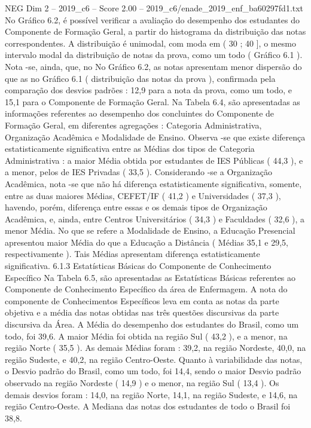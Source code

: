 \begin{textsample}{NEG Dim 2 – 2019\_c6 – Score 2.00 – 2019\_c6/enade\_2019\_enf\_ba60297fd1.txt}
No Gráfico 6.2, é possível verificar a avaliação do desempenho dos estudantes do Componente de Formação Geral, a partir do histograma da distribuição das notas correspondentes.
A distribuição é unimodal, com moda em ( 30 ; 40 ], o mesmo intervalo modal da distribuição de notas da prova, como um todo ( Gráfico 6.1 ).
Nota -se, ainda, que, no No Gráfico 6.2, as notas apresentam menor dispersão do que as no Gráfico 6.1 ( distribuição das notas da prova ), confirmada pela comparação dos desvios padrões : 12,9 para a nota da prova, como um todo, e 15,1 para o Componente de Formação Geral.
Na Tabela 6.4, são apresentadas as informações referentes ao desempenho dos concluintes do Componente de Formação Geral, em diferentes agregações : Categoria Administrativa, Organização Acadêmica e Modalidade de Ensino.
Observa -se que existe diferença estatisticamente significativa entre as Médias dos tipos de Categoria Administrativa : a maior Média obtida por estudantes de IES Públicas ( 44,3 ), e a menor, pelos de IES Privadas ( 33,5 ).
Considerando -se a Organização Acadêmica, nota -se que não há diferença estatisticamente significativa, somente, entre as duas maiores Médias, CEFET/IF ( 41,2 ) e Universidades ( 37,3 ), havendo, porém, diferença entre essas e os demais tipos de Organização Acadêmica, e, ainda, entre Centros Universitários ( 34,3 ) e Faculdades ( 32,6 ), a menor Média.
No que se refere a Modalidade de Ensino, a Educação Presencial apresentou maior Média do que a Educação a Distância ( Médias 35,1 e 29,5, respectivamente ).
Tais Médias apresentam diferença estatisticamente significativa. 6.1.3 Estatísticas Básicas do Componente de Conhecimento Específico Na Tabela 6.5, são apresentadas as Estatísticas Básicas referentes ao Componente de Conhecimento Específico da área de Enfermagem.
A nota do componente de Conhecimentos Específicos leva em conta as notas da parte objetiva e a média das notas obtidas nas três questões discursivas da parte discursiva da Área.
A Média do desempenho dos estudantes do Brasil, como um todo, foi 39,6.
A maior Média foi obtida na região Sul ( 43,2 ), e a menor, na região Norte ( 35,5 ).
As demais Médias foram : 39,2, na região Nordeste, 40,0, na região Sudeste, e 40,2, na região Centro-Oeste.
Quanto à variabilidade das notas, o Desvio padrão do Brasil, como um todo, foi 14,4, sendo o maior Desvio padrão observado na região Nordeste ( 14,9 ) e o menor, na região Sul ( 13,4 ).
Os demais desvios foram : 14,0, na região Norte, 14,1, na região Sudeste, e 14,6, na região Centro-Oeste.
A Mediana das notas dos estudantes de todo o Brasil foi 38,8.

\end{textsample}
